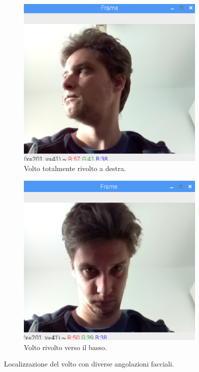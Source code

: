 \documentclass[12pt]{article}
\begin{document}
\begin{figure}[!htb]
\begin{subfigure}{.3\textwidth}
		\includegraphics[width=.8\linewidth]{eps/mp_full_right_view.eps}
		\caption{Volto totalmente rivolto a destra.}
	\end{subfigure}
	\hspace{5mm}
	\begin{subfigure}{.3\textwidth}
		\centering
		\includegraphics[width=.8\linewidth]{eps/mp_downward_view.eps}
		\caption{Volto rivolto verso il basso.}
	\end{subfigure}
	\caption{Localizzazione del volto con diverse angolazioni facciali.}
	\label{fig:face_poses}
\end{figure}

\end{document}
